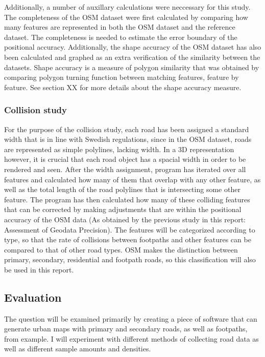 \documentclass[a4paper]{article}
\begin{document}
Additionally, a number of auxillary calculations were neccessary for this study.
The completeness of the OSM dataset were first calculated by comparing how many features are represented in both the OSM dataset and the reference dataset.
The completeness is needed to estimate the error boundary of the positional accuracy.
Additionally, the shape accuracy of the OSM dataset has also been calculated and graphed as an extra verification of the similarity between the datasets.
Shape accuracy is a measure of polygon similarity that was obtained by comparing polygon turning function between matching features, feature by feature.
See section XX for more details about the shape accuracy measure. %

\subsubsection{Collision study}

For the purpose of the collision study, each road has been assigned a standard width that is in line with Swedish regulations, since in the OSM dataset, roads are represented as simple polylines, lacking width.
In a 3D representation however, it is crucial that each road object has a spacial width in order to be rendered and seen.
After the width assignment, program has iterated over all features and calculated how many of them that overlap with any other feature, as well as the total length of the road polylines that is intersecting some other feature.
The program has then calculated how many of these colliding features that can be corrected by making adjustments that are within the positional accuracy of the OSM data (As obtained by the previous study in this report: Assessment of Geodata Precision).
The features will be categorized according to type, so that the rate of collisions between footpaths and other features can be compared to that of other road types.
OSM makes the distinction between primary, secondary, residential and footpath roads, so this classification will also be used in this report.

\subsection{Evaluation}

The question will be examined primarily by creating a piece of software that can generate urban maps with primary and secondary roads, as well as footpaths, from example.
I will experiment with different methods of collecting road data as well as different sample amounts and densities.
\end{document}
